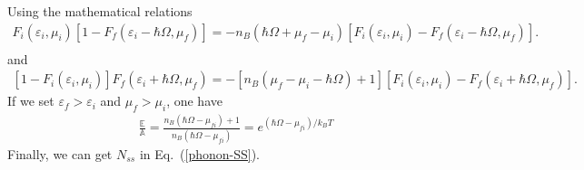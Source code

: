 \documentclass[aps
,twocolumn
,floatfix,footinbib]{revtex4-1}
\begin{document}
Using the mathematical relations
\begin{equation}
\begin{split}
F_{i}(\varepsilon_{i},\mu_{i})[1-F_{f}(\varepsilon_{i}-\hbar\Omega,\mu_{f})]=-n_{B}(\hbar\Omega+\mu_{f}-\mu_{i})[F_{i}(\varepsilon_{i},\mu_{i})-F_{f}(\varepsilon_{i}-\hbar\Omega,\mu_{f})].\\
\end{split}
\end{equation}
and
\begin{equation}
\begin{split}
[1-F_{i}(\varepsilon_{i},\mu_{i})]F_{f}(\varepsilon_{i}+\hbar\Omega,\mu_{f})=-[n_{B}(\mu_{f}-\mu_{i}-\hbar\Omega)+1][F_{i}(\varepsilon_{i},\mu_{i})-F_{f}(\varepsilon_{i}+\hbar\Omega,\mu_{f})].
\end{split}
\end{equation}
If we set $\varepsilon_{f}>\varepsilon_{i}$ and $\mu_{f}>\mu_{i}$, one have
\begin{equation}
\begin{split}
\frac{\mathbb{E}}{\mathbb{A}}=\frac{n_{B}(\hbar\Omega-\mu_{fi})+1}{n_{B}(\hbar\Omega-\mu_{fi})}=e^{(\hbar\Omega-\mu_{fi})/k_{B}T}
\end{split}
\end{equation}
Finally, we can get $N_{ss}$ in Eq.~(\ref{phonon-SS}).
\fi




\twocolumngrid

\end{document}
